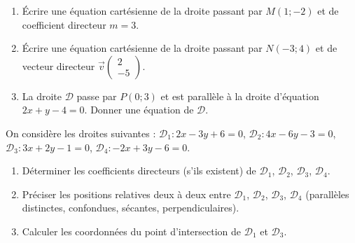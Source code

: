 \documentclass[11pt]{article}
\begin{document}
\begin{exercice}
\begin{enumerate}
    \item Écrire une équation cartésienne de la droite passant par $M(1;-2)$ et de coefficient directeur $m=3$.
    \item Écrire une équation cartésienne de la droite passant par $N(-3;4)$ et de vecteur directeur $\vec{v}\begin{pmatrix}2\\-5\end{pmatrix}$.
    \item La droite $\mathcal{D}$ passe par $P(0;3)$ et est parallèle à la droite d'équation $2x+y-4=0$. Donner une équation de $\mathcal{D}$.
\end{enumerate}
\end{exercice}

\begin{exercice}
On considère les droites suivantes :
$\mathcal{D}_1: 2x-3y+6=0$,
$\mathcal{D}_2: 4x-6y-3=0$,
$\mathcal{D}_3: 3x+2y-1=0$,
$\mathcal{D}_4: -2x+3y-6=0$.
\begin{enumerate}
    \item Déterminer les coefficients directeurs (s'ils existent) de $\mathcal{D}_1$, $\mathcal{D}_2$, $\mathcal{D}_3$, $\mathcal{D}_4$.
    \item Préciser les positions relatives deux à deux entre $\mathcal{D}_1$, $\mathcal{D}_2$, $\mathcal{D}_3$, $\mathcal{D}_4$ (parallèles distinctes, confondues, sécantes, perpendiculaires).
    \item Calculer les coordonnées du point d'intersection de $\mathcal{D}_1$ et $\mathcal{D}_3$.
\end{enumerate}
\end{exercice}
\end{document}
